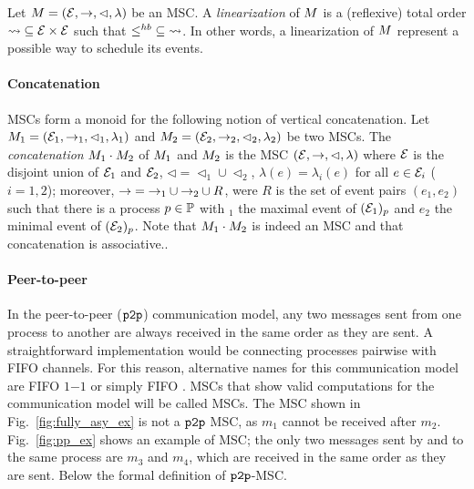 Let $M = (\mathcal{E},\to,\lhd,\lambda)$ be an MSC.
A \emph{linearization} of $M$ is a (reflexive) total order ${\rightsquigarrow} \subseteq \mathcal{E} \times \mathcal{E}$ such that ${\leq^{hb}} \subseteq {\rightsquigarrow}$. In other words, a linearization of $M$ represent a possible way to schedule its events.

\paragraph*{Concatenation}
MSCs form a monoid for the following notion of vertical concatenation.
Let $M_1 = (\mathcal{E}_1,\to_1,\lhd_1,\lambda_1)$ and
$M_2 = (\mathcal{E}_2,\to_2,\lhd_2,\lambda_2)$ be two MSCs.
The \emph{concatenation} $M_1 \cdot M_2$ of $M_1$ and $M_2$ is the MSC 
$(\mathcal{E},\to,\lhd,\lambda)$ where $\mathcal{E}$ is the disjoint 
union of $\mathcal{E}_1$ and $\mathcal{E}_2$,
${\lhd}  = {\lhd_1} \cup {\lhd_2}$, $\lambda(e)=\lambda_i(e)$ for all $e\in \mathcal{E}_i$ ($i=1,2$); 
moreover, ${\to} = {\to_1} \cup {\to_2} \cup R$,
were $R$ is the set of event pairs $(e_1,e_2)$ 
such that there is a process $p \in \mathbb{P}$ with $_1$ the maximal event of 
$(\mathcal{E}_1)_p$ and $e_2$ the minimal event of
$(\mathcal{E}_2)_p$.
Note that $M_1 \cdot M_2$ is indeed an MSC and that
concatenation is associative..


\paragraph{\bf Peer-to-peer}
In the peer-to-peer ($\mathtt{p2p}$) communication model, any two messages sent from one process to another  are always received in the same order as they are sent. A straightforward implementation would be connecting processes pairwise with FIFO channels. %
For this reason, alternative names for this communication model are FIFO $1\mathsf{-}1$ \cite{DBLP:journals/fac/ChevrouHQ16} or simply FIFO \cite{babaoglu1993consistent, DBLP:journals/dc/Charron-BostMT96, tel2000introduction}.
MSCs that show valid computations for the \pp communication model will be called \pp MSCs.
The MSC shown in Fig.~\ref{fig:fully_asy_ex} is not a $\mathtt{p2p}$ MSC, as $m_1$ cannot be received after $m_2$.
Fig.~\ref{fig:pp_ex} shows an example of \pp MSC; the only two messages sent by and to the same process are $m_3$ and $m_4$, which are received in the same order as they are sent. Below the formal definition of $\mathtt{p2p}$-MSC.

